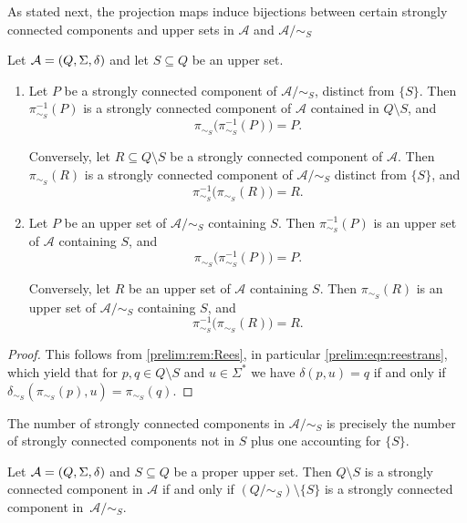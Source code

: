 As stated next, the projection maps induce bijections between 
certain strongly connected components and upper sets
in $\mathcal A$ and $\mathcal A / {\sim_S}$

\begin{proposition}\label{prelim:automata:Rees:prop:correspondence}
	Let $\mathcal A = (Q, \Sigma, \delta)$ and let $S\subseteq Q$ be an upper set.
	
	\begin{enumerate}
		\item Let $P$ be a strongly connected component of $\mathcal A/{\sim_S}$,
		distinct from $\{S\}$.
		Then $\pi_{\sim_S}^{-1}(P)$ is a strongly connected component of
		$\mathcal A$ contained in $Q\setminus S$, and
		\[
		\pi_{\sim_S}\bigl(\pi_{\sim_S}^{-1}(P)\bigr)=P.
		\]
		
		Conversely, let $R\subseteq Q\setminus S$ be a strongly connected component
		of $\mathcal A$.
		Then $\pi_{\sim_S}(R)$ is a strongly connected component of
		$\mathcal A/{\sim_S}$ distinct from $\{S\}$, and
		\[
		\pi_{\sim_S}^{-1}\bigl(\pi_{\sim_S}(R)\bigr)=R.
		\]
		
		\item Let $P$ be an upper set of $\mathcal A/{\sim_S}$ containing $S$.
		Then $\pi_{\sim_S}^{-1}(P)$ is an upper set of $\mathcal A$
		containing $S$, and
		\[
		\pi_{\sim_S}\bigl(\pi_{\sim_S}^{-1}(P)\bigr)=P.
		\]
		
		Conversely, let $R$ be an upper set of $\mathcal A$ containing $S$.
		Then $\pi_{\sim_S}(R)$ is an upper set of
		$\mathcal A/{\sim_S}$ containing $S$, and
		\[
		\pi_{\sim_S}^{-1}\bigl(\pi_{\sim_S}(R)\bigr)=R.
		\]
	\end{enumerate}
\end{proposition}
\begin{proof}
	This follows from \cref{prelim:rem:Rees},
	in particular \cref{prelim:eqn:reestrans}, 
	which yield that for $p,q \in Q \setminus S$ and $u \in \Sigma^*$
	we have $\delta(p, u) = q$
	if and only if $\delta_{\sim_S}(\pi_{\sim_S}(p), u) = \pi_{\sim_S}(q)$.
\end{proof}

\begin{corollary}
	The number of strongly connected components in $\mathcal A /{\sim_S}$
	is precisely the number of strongly connected components not in $S$
	plus one accounting for $\{S\}$.
\end{corollary}

\begin{corollary}
	Let $\mathcal A = (Q, \Sigma, \delta)$ and $S \subseteq Q$ be a proper upper set.
	Then $Q \setminus S$ is a strongly connected component in $\mathcal A$
	if and only if
	$( Q / {\sim_S} ) \setminus \{S\}$ is a strongly connected component in~$\mathcal A / {\sim_S}$.	
\end{corollary}


